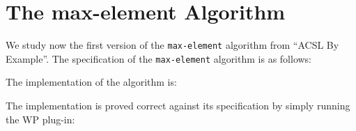 \section{The \textsf{max-element} Algorithm}
\label{max-element}

We study now the first version of the \texttt{max-element}
algorithm from ``ACSL By Example''. 
The specification of the \texttt{max-element} algorithm is as follows:


The implementation of the algorithm is:


The implementation is proved correct against its specification by
simply running the \textsf{WP} plug-in: 

